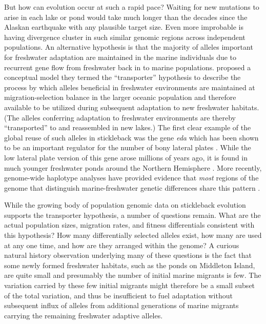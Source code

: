 \documentclass{article}
\begin{document}
But how can evolution occur at such a rapid pace?
Waiting for new mutations to arise in each lake or pond would take much longer than the decades since the Alaskan earthquake
with any plausible target size.
Even more improbable is having divergence cluster in such similar genomic regions across independent populations. 
An alternative hypothesis
is that the majority of alleles important for freshwater adaptation are maintained in the marine individuals due to recurrent gene flow from freshwater back in to marine populations. 
\citet{schluter2009genetics} proposed a conceptual model they termed the ``transporter'' hypothesis to describe the process by which 
alleles beneficial in freshwater environments are maintained at migration-selection balance in the larger oceanic population and therefore available to be utilized during subsequent adaptation to new freshwater habitats.
(The alleles conferring adaptation to freshwater environments are thereby ``transported'' to and reassembled in new lakes.)
The first clear example of the global reuse of such alleles in stickleback was the gene \textit{eda} which has been shown to be an important regulator for the number of bony lateral plates 
\citep{Colosimo_2004, Cresko_2004, Colosimo_2005}. 
While the low lateral plate version of this gene arose millions of years ago, it is found in much younger freshwater ponds around the Northern Hemisphere 
\citep{O'Brian_2015}. 
More recently, genome-wide haplotype analyses have provided evidence that \textit{most} regions of the genome that distinguish marine-freshwater genetic differences share this pattern \citep{nelson2017ancient}. 

While the growing body of population genomic data on stickleback evolution supports the transporter hypothesis, a number of questions remain. 
What are the actual population sizes, migration rates, and fitness differentials consistent with this hypothesis? 
How many differentially selected alleles exist, how many are used at any one time, and how are they arranged within the genome? 
A curious natural history observation underlying many of these questions is the fact that some newly formed freshwater habitats, such as the ponds on Middleton Island, 
are quite small and presumably the number of initial marine migrants is few. The variation carried by these few initial migrants might therefore be a small subset of the total variation, and thus be insufficient to fuel adaptation without subsequent influx of alleles from additional generations of marine migrants carrying the remaining freshwater adaptive alleles.
\end{document}
